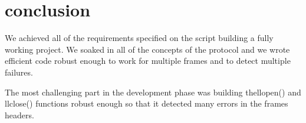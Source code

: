 \documentclass[contents.tex]{subfiles}
\begin{document}
\section{conclusion}\label{sec:conclusion}

We achieved all of the requirements specified on the script building a fully working project. We soaked in all of the concepts of the protocol and we wrote efficient code robust enough to work for multiple frames and to detect multiple failures.

The most challenging part in the development phase was building thellopen() and llclose() functions robust enough so that it detected many errors in the frames headers.
\end{document}
